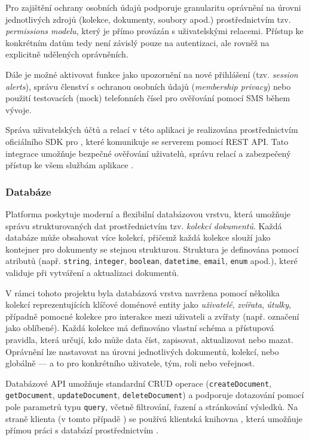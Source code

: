 \documentclass[czech, bp, kiv, he, iso690numb, pdf]{fasthesis}
\begin{document}
    Pro zajištění ochrany osobních údajů  podporuje granularitu oprávnění na úrovni jednotlivých zdrojů (kolekce, dokumenty, soubory apod.) prostřednictvím tzv. \textit{permissions modelu}, který je přímo provázán s uživatelskými relacemi. Přístup ke konkrétním datům tedy není závislý pouze na autentizaci, ale rovněž na explicitně udělených oprávněních.

    Dále je možné aktivovat funkce jako upozornění na nové přihlášení (tzv. \textit{session alerts}), správu členství s ochranou osobních údajů (\textit{membership privacy}) nebo použití testovacích (mock) telefonních čísel pro ověřování pomocí SMS během vývoje.

    Správa uživatelských účtů a relací v této aplikaci je realizována prostřednictvím oficiálního SDK  pro , které komunikuje se serverem pomocí REST API. Tato integrace umožňuje bezpečné ověřování uživatelů, správu relací a zabezpečený přístup ke všem službám aplikace \cite{appwrite-auth}.




    \subsubsection*{Databáze}

    Platforma  poskytuje moderní a flexibilní databázovou vrstvu, která umožňuje správu strukturovaných dat prostřednictvím tzv. \textit{kolekcí dokumentů}. Každá databáze může obsahovat více kolekcí, přičemž každá kolekce slouží jako kontejner pro dokumenty se stejnou strukturou. Struktura je definována pomocí atributů (např. \texttt{string}, \texttt{integer}, \texttt{boolean}, \texttt{datetime}, \texttt{email}, \texttt{enum} apod.), které  validuje při vytváření a aktualizaci dokumentů.

    V rámci tohoto projektu byla databázová vrstva navržena pomocí několika kolekcí reprezentujících klíčové doménové entity jako \textit{uživatelé}, \textit{zvířata}, \textit{útulky}, případně pomocné kolekce pro interakce mezi uživateli a zvířaty (např. označení jako oblíbené). Každá kolekce má definováno vlastní schéma a přístupová pravidla, která určují, kdo může data číst, zapisovat, aktualizovat nebo mazat. Oprávnění lze nastavovat na úrovni jednotlivých dokumentů, kolekcí, nebo globálně — a to pro konkrétního uživatele, tým, roli nebo veřejnost.

    Databázové API  umožňuje standardní CRUD operace (\texttt{createDocument}, \texttt{getDocument}, \texttt{updateDocument}, \texttt{deleteDocument}) a podporuje dotazování pomocí pole parametrů typu \texttt{query}, včetně filtrování, řazení a stránkování výsledků. Na straně klienta (v tomto případě ) se používá klientská knihovna , která umožňuje přímou práci s databází prostřednictvím .
\end{document}
